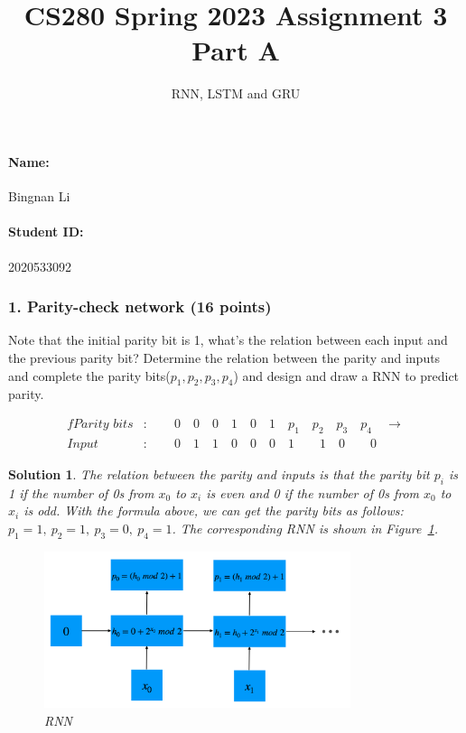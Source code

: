 \documentclass[12pt]{article}%
\newtheorem{solution}[theorem]{Solution}
\begin{document}
    \title{CS280 Spring 2023 Assignment 3 \\ Part A}
    \author{RNN, LSTM and GRU}
    \maketitle

    \paragraph{Name:} Bingnan Li

    \paragraph{Student ID:} 2020533092

    \newpage


    \subsubsection*{1. Parity-check network (16 points)}
    Note that the initial parity bit is 1, what's the relation between each input and the previous parity bit? Determine the relation between the parity and inputs and complete the parity bits($p_1,p_2,p_3,p_4$) and design and draw a RNN to predict parity.

    \begin{align*}f
        \textit{Parity bits}&:\quad\quad0\quad0\quad0\quad1\quad0\quad1\quad p_1\quad p_2\quad p_3 \quad p_4 \quad\rightarrow \\
        \textit{Input}&:\quad\quad0\quad1\quad1\quad0\quad0\quad0\quad1\qquad1\quad0\qquad0
    \end{align*}
    \begin{solution}
        The relation between the parity and inputs is that the parity bit $p_i$ is 1 if the number of 0s from $x_0$ to $x_i$ is even and 0 if the number of 0s from $x_0$ to $x_i$ is odd.
        With the formula above, we can get the parity bits as follows:
        $p_1 = 1,\ p_2 = 1,\ p_3 = 0,\ p_4 = 1$.
        The corresponding RNN is shown in Figure~\ref{fig:RNN}.
        \begin{figure}[htbp]
            \centering
            \includegraphics[width=0.8\textwidth]{images/partA_p1}
            \caption{RNN}
            \label{fig:RNN}
        \end{figure}
    \end{solution}
\end{document}
